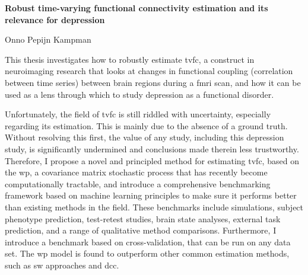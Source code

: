 
\cleardoublepage
\begin{center}
    \vspace*{2em}
    { \Large {\bfseries Robust time-varying functional connectivity estimation and its relevance for depression} \par}
    {{\large \vspace*{1em} Onno Pepijn Kampman} \par}
    \vspace{2em}
\end{center}

This thesis investigates how to robustly estimate \gls{tvfc}, a construct in neuroimaging research that looks at changes in functional coupling (correlation between time series) between brain regions during a \gls{fmri} scan, and how it can be used as a lens through which to study depression as a functional disorder.

Unfortunately, the field of \gls{tvfc} is still riddled with uncertainty, especially regarding its estimation.
This is mainly due to the absence of a ground truth.
Without resolving this first, the value of any study, including this depression study, is significantly undermined and conclusions made therein less trustworthy.
Therefore, I propose a novel and principled method for estimating \gls{tvfc}, based on the \gls{wp}, a covariance matrix stochastic process that has recently become computationally tractable, and introduce a comprehensive benchmarking framework based on machine learning principles to make sure it performs better than existing methods in the field.
These benchmarks include simulations, subject phenotype prediction, test-retest studies, brain state analyses, external task prediction, and a range of qualitative method comparisons.
Furthermore, I introduce a benchmark based on cross-validation, that can be run on any data set.
The \gls{wp} model is found to outperform other common estimation methods, such as \gls{sw} approaches and \gls{dcc}.

